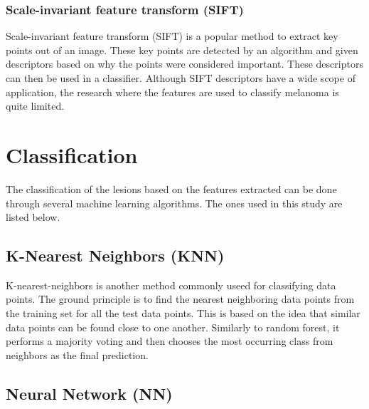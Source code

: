 \documentclass{kththesis}
\begin{document}
\subsubsection{Scale-invariant feature transform (SIFT)}


Scale-invariant feature transform (SIFT) is a popular method to extract key points out of an image. These key points are detected by an algorithm and given descriptors based on why the points were considered important. These descriptors can then be used in a classifier. \parencite{lowe2004distinctive}
Although SIFT descriptors have a  wide scope of application, the research where the features are used to classify melanoma is quite limited.

\section{Classification}

The classification of the lesions based on the features extracted can be done through several machine learning algorithms. The ones used in this study are listed below.






\subsection{K-Nearest Neighbors (KNN)}

K-nearest-neighbors is another method commonly  useed for classifying data points. The ground principle is to find the nearest neighboring data points from the training set for all the test data points. This is based on the idea that similar data points can be found close to one another. Similarly to random forest, it performs a majority voting and then chooses the most occurring class from neighbors as the final prediction. \parencite{ibmknn}


\subsection{Neural Network (NN)}
\end{document}
